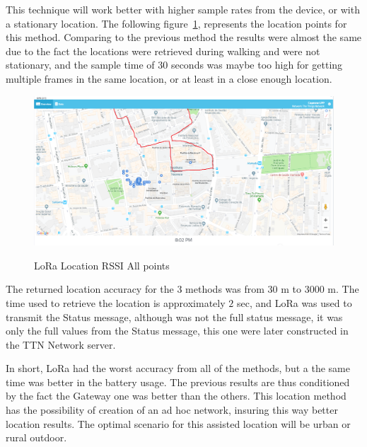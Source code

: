 This technique will work better with higher sample rates from the device, or with a stationary location. The following figure~\ref{fig:lora_geo_multiframe}, represents the location points for this method. Comparing to the previous method the results were almost the same due to the fact the locations were retrieved during walking and were not stationary, and the sample time of 30 seconds was maybe too high for getting multiple frames in the same location, or at least in a close enough location.
\begin{figure}[htbp]
  \centering
  
    {\includegraphics[width=0.8\linewidth]{Chapters/Figures/lorageores27-3.PNG}}%
 
  \caption{LoRa Location RSSI All points}
  \label{fig:lora_geo_multiframe}
\end{figure}


The returned location accuracy for the 3 methods was from  30 m to 3000 m. The time used to retrieve the location is approximately $2$ sec, and LoRa was used to transmit the Status message, although was not the full status message, it was only the full values from the Status message, this one were later constructed in the TTN Network server.

In short, LoRa had the worst accuracy from all of the methods, but a the same time was better in the battery usage. The previous results are thus conditioned by the fact the Gateway one was better than the others. This location method has the possibility of creation of an ad hoc network, insuring this way better location results. The optimal scenario for this assisted location will be urban or rural outdoor.





\newpage

